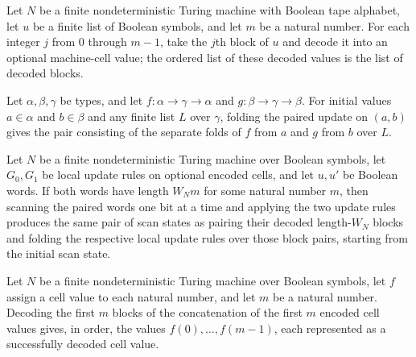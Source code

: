\begin{definition}
\label{Complexity.Codec.blocksD}
\leanok
{}
Let $N$ be a finite nondeterministic Turing machine with Boolean tape alphabet, let $u$
be a finite list of Boolean symbols, and let $m$ be a natural number. For each integer
$j$ from $0$ through $m-1$, take the $j$th block of $u$ and decode it into an optional
machine-cell value; the ordered list of these decoded values is the list of decoded
blocks.
\end{definition}

\begin{lemma}
\label{Complexity.Codec.foldl_pair}
\leanok
{}
Let $\alpha,\beta,\gamma$ be types, and let $f : \alpha\to\gamma\to\alpha$ and $g :
\beta\to\gamma\to\beta$. For initial values $a\in\alpha$ and $b\in\beta$ and any finite
list $L$ over $\gamma$, folding the paired update on $(a,b)$ gives the pair consisting
of the separate folds of $f$ from $a$ and $g$ from $b$ over $L$.
\end{lemma}

\begin{theorem}
\label{Complexity.Codec.sScan_eq}
\leanok
{}
Let $N$ be a finite nondeterministic Turing machine over Boolean symbols, let $G_0,G_1$
be local update rules on optional encoded cells, and let $u,u'$ be Boolean words. If
both words have length $W_Nm$ for some natural number $m$, then scanning the paired
words one bit at a time and applying the two update rules produces the same pair of scan
states as pairing their decoded length-$W_N$ blocks and folding the respective local
update rules over those block pairs, starting from the initial scan state.
\end{theorem}

\begin{lemma}
\label{Complexity.Codec.blocksD_chunksWord}
\leanok
{}
Let $N$ be a finite nondeterministic Turing machine over Boolean symbols, let $f$ assign
a cell value to each natural number, and let $m$ be a natural number. Decoding the first
$m$ blocks of the concatenation of the first $m$ encoded cell values gives, in order,
the values $f(0),\ldots,f(m-1)$, each represented as a successfully decoded cell value.
\end{lemma}

